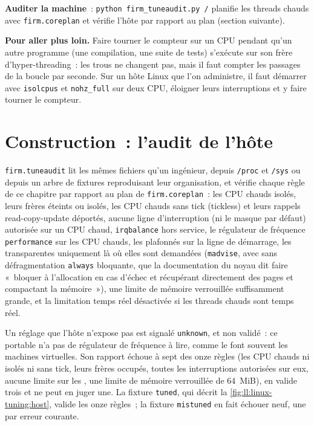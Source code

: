 \begin{tutorial}
\begin{tutsteps}
\item \textbf{Auditer la machine}~: \texttt{python firm\_tuneaudit.py /} planifie les threads chauds avec \texttt{firm.coreplan} et
vérifie l'hôte par rapport au plan (section suivante).
\end{tutsteps}
\textbf{Pour aller plus loin.} Faire tourner le compteur sur un CPU pendant qu'un autre programme (une compilation, une suite de tests) s'exécute sur son
frère d'hyper-threading~: les trous ne changent pas, mais il faut compter les passages de la boucle par seconde. Sur un hôte Linux que l'on administre, il faut démarrer avec
\texttt{isolcpus} et \texttt{nohz\_full} sur deux CPU, éloigner leurs interruptions et y faire tourner le compteur.
\end{tutorial}

\section{Construction~: l'audit de l'hôte}\label{bld:ll:linux-tuning:tuneaudit}

\texttt{firm.tuneaudit} lit les mêmes fichiers qu'un ingénieur, depuis \texttt{/proc} et \texttt{/sys} ou depuis un arbre de fixtures
reproduisant leur organisation, et vérifie chaque règle de ce chapitre par rapport au plan de \texttt{firm.coreplan}~: les CPU chauds isolés,
leurs frères éteints ou isolés, les CPU chauds sans tick (tickless) et leurs rappels read-copy-update déportés, aucune ligne d'interruption
(ni le masque par défaut) autorisée sur un CPU chaud, \texttt{irqbalance} hors service, le régulateur de fréquence \texttt{performance} sur
les CPU chauds, les  plafonnés sur la ligne de démarrage, les  transparentes uniquement là où elles sont demandées (\texttt{madvise}, avec
sans défragmentation \texttt{always} bloquante, que la documentation du noyau dit faire «~bloquer à l'allocation
en cas d'échec et récupérant directement des pages et compactant la mémoire~»), une limite de mémoire verrouillée suffisamment grande, et la limitation temps réel désactivée
si les threads chauds sont temps réel.

\label{lst:ll:linux-tuning:audit}

Un réglage que l'hôte n'expose pas est signalé \texttt{unknown}, et non validé~: ce portable n'a pas de régulateur de fréquence à lire, comme
le font souvent les machines virtuelles. Son rapport échoue à sept des onze règles (les CPU chauds ni isolés ni sans tick, leurs
frères occupés, toutes les interruptions autorisées sur eux, aucune limite sur les , une limite de mémoire verrouillée de 64~MiB), en valide trois et ne peut
en juger une. La fixture \texttt{tuned}, qui décrit la \cref{fig:ll:linux-tuning:host}, valide les onze règles~; la fixture \texttt{mistuned}
en fait échouer neuf, une par erreur courante.

